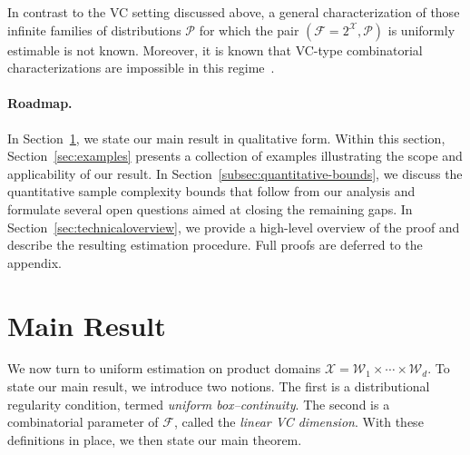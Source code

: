 \documentclass[arxiv]{colt2026}
\newcommand{\X}{\mathcal{X}}
\newcommand{\F}{\mathcal{F}}
\newcommand{\W}{\mathcal{W}}
\newcommand{\Pc}{\mathcal{P}}
\begin{document}
In contrast to the VC setting discussed above, a general characterization of those infinite families of distributions $\Pc$ for which the pair $(\F = 2^{\X}, \Pc)$ is uniformly estimable is not known.
Moreover, it is known that VC-type combinatorial characterizations are impossible in this regime~\citep{lechner2024}.



\vspace{-0.5em}
\paragraph{Roadmap.}
In Section~\ref{sec:main}, we state our main result {in qualitative form.}
Within this section, Section~\ref{sec:examples} presents a collection of examples
illustrating the scope and applicability of our result.
{In Section~\ref{subsec:quantitative-bounds}, we discuss the quantitative
sample complexity bounds that follow from our analysis and formulate several
open questions aimed at closing the remaining gaps.}
In Section~\ref{sec:technicaloverview}, we provide a high-level overview of the
proof and describe the resulting estimation procedure.
Full proofs are deferred to the appendix.

\vspace{-1em}
\section{Main Result}\label{sec:main}

We now turn to uniform estimation on product domains \(\X = \W_1 \times \cdots \times \W_d.\)
To state our main result, we introduce two notions.
The first is a distributional regularity condition, termed \emph{uniform box--continuity}.
The second is a combinatorial parameter of $\F$, called the \emph{linear VC dimension}.
With these definitions in place, we then state our main theorem.
\end{document}
